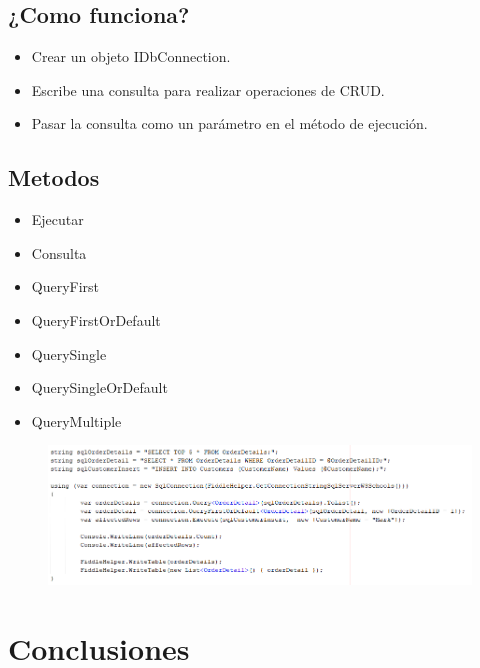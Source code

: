 \documentclass[preprint,12pt]{elsarticle}
\begin{document}
\subsection{\textbf{¿Como funciona?}}
\begin{itemize}
\item Crear un objeto IDbConnection.
\item Escribe una consulta para realizar operaciones de CRUD.
\item Pasar la consulta como un parámetro en el método de ejecución.
\end{itemize}

\subsection{\textbf{Metodos}}
\begin{itemize}
\item Ejecutar
\item Consulta
\item QueryFirst
\item QueryFirstOrDefault
\item QuerySingle
\item QuerySingleOrDefault
\item QueryMultiple
\end{itemize}

\begin{figure}
\begin{center}
\includegraphics[width=14cm]{./Imagenes/Ejemplo}
\end{center}
\end{figure}




\section{Conclusiones}
\end{document}
